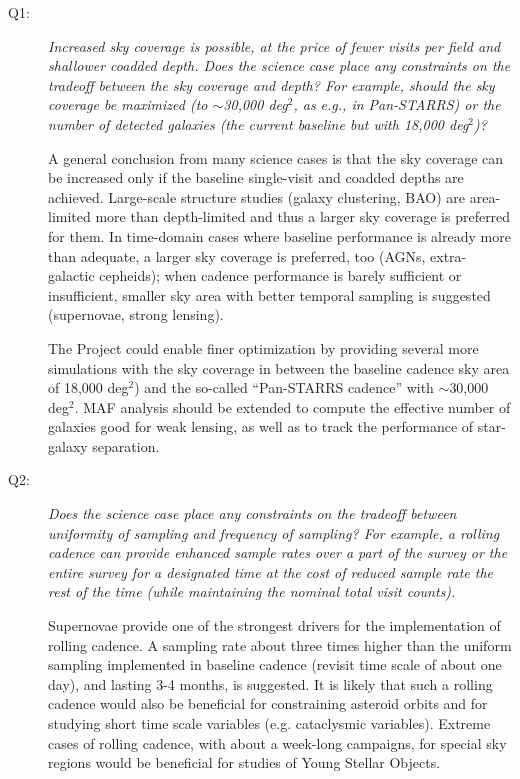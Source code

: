 \begin{description}

\item[Q1:] {\it Increased sky coverage is possible, at the price of fewer visits per field and shallower 
coadded depth.  Does the science case place any constraints on the
tradeoff between the sky coverage and depth? For example, should
the sky coverage be maximized (to $\sim$30,000 deg$^2$, as e.g., in
Pan-STARRS) or the number of detected galaxies (the current baseline but
with 18,000 deg$^2$)?}

A general conclusion from many science cases is that the sky coverage
can be increased only if the baseline single-visit and coadded depths
are achieved. Large-scale structure studies (\eg galaxy clustering, BAO) are 
area-limited more than depth-limited and thus a larger sky coverage is 
preferred for them. In time-domain cases where baseline performance is already 
more than adequate, a larger sky coverage is preferred, too (AGNs, 
extra-galactic cepheids); when cadence performance is barely sufficient 
or insufficient, smaller sky area with better temporal sampling is suggested 
(supernovae, strong lensing). 

The Project could enable finer optimization by providing several more
simulations with the sky coverage in between the baseline cadence sky
area of 18,000 deg$^2$) and the so-called ``Pan-STARRS cadence'' with
$\sim$30,000 deg$^2$. MAF analysis should be extended to compute the
effective number of galaxies good for weak lensing, as well as to track
the performance of star-galaxy separation.


\item[Q2:] {\it Does the science case place any constraints on the
tradeoff between uniformity of sampling and frequency of  sampling? For
example, a rolling cadence can provide enhanced sample rates over a part
of the survey or the entire survey for a designated time at the cost of
reduced sample rate the rest of the time (while maintaining the nominal
total visit counts).}

Supernovae provide one of the strongest drivers for the implementation of
rolling cadence. A sampling rate about three times higher than the
uniform sampling implemented in baseline cadence (revisit time scale of
about one day), and lasting 3-4 months, is suggested. It is likely that
such a rolling cadence would also be beneficial for constraining
asteroid orbits and for studying short time scale variables (e.g.
cataclysmic variables). Extreme cases of rolling cadence, with about a
week-long campaigns, for special sky regions would be beneficial for
studies of Young Stellar Objects.


\end{description}

